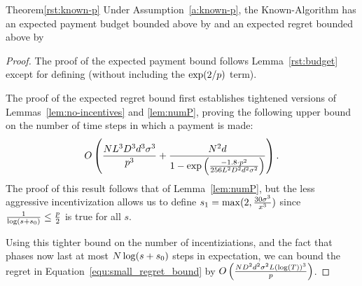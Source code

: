\begin{rtheorem}{Theorem}{\ref{rst:known-p}}
Under Assumption~\ref{a:known-p}, the Known-\MinProb Algorithm has an expected payment budget bounded above by 
and an expected regret bounded above by
\end{rtheorem}

\begin{proof}
  The proof of the expected payment bound follows Lemma~\ref{rst:budget} except for defining
(without including the $\exp(2/p)$ term).

The proof of the expected regret bound first establishes tightened versions of Lemmas~\ref{lem:no-incentives} and \ref{lem:numP},
proving the following upper bound on the number of time steps in which a payment is made:
\begin{align}
O\left(\frac{N L^3 D^3 d^3 \sigma^3}{p^3}
  + \frac{N^2 d}{1 - \exp \left(
    \frac{-1.8 \cdot p^2}{256 L^2 D^2 d^2 \sigma^2}
  \right)} \right). \nonumber 
\end{align}
The proof of this result follows that of Lemma~\ref{lem:numP},
but the less aggressive incentivization allows us to define $s_1 = \max(2, \frac{30 \sigma^3}{x^3})$ since $\frac{1}{\log(s+s_0)} \leq \frac{p}{2}$ is true for all $s$.

Using this tighter bound on the number of incentiziations, and the fact that phases now last at most $N \log(s+s_0)$ steps in expectation, we can bound the regret in Equation~\ref{equ:small_regret_bound} by
$O\left(\frac{ND^2 d^2\sigma^2 L(\log(T))^3}{p}\right)$.
\end{proof}

